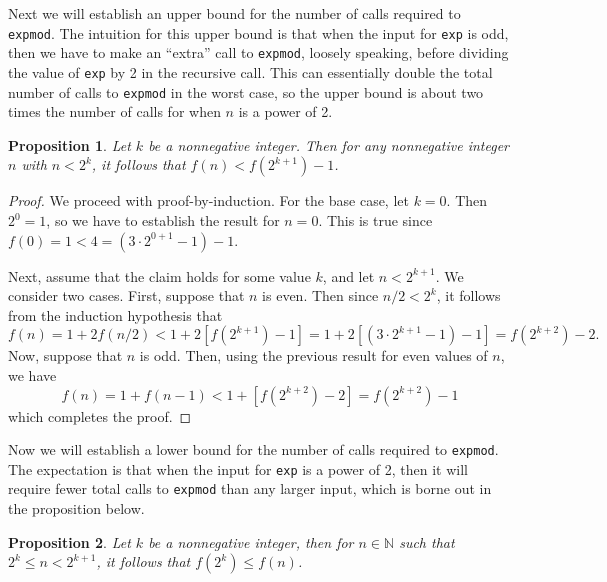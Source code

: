 \documentclass{article}
\newtheorem{proposition}{Proposition}
\begin{document}
Next we will establish an upper bound for the number of calls required to
\lstinline{expmod}.  The intuition for this upper bound is that when the input
for \lstinline{exp} is odd, then we have to make an ``extra'' call to
\lstinline{expmod}, loosely speaking, before dividing the value of
\lstinline{exp} by 2 in the recursive call.  This can essentially double the
total number of calls to \lstinline{expmod} in the worst case, so the upper
bound is about two times the number of calls for when $n$ is a power of 2.

\begin{proposition}
  \label{thm:f-non-powers-of-two}
  Let $k$ be a nonnegative integer.  Then for any nonnegative integer $n$ with
  $n < 2^k$, it follows that $f(n) < f(2^{k + 1}) - 1$.
\end{proposition}

\begin{proof}
  We proceed with proof-by-induction.  For the base case, let $k = 0$.  Then
  $2^0 = 1$, so we have to establish the result for $n = 0$.  This is true since
  $f(0) = 1 < 4 = (3 \cdot 2^{0 + 1} - 1) - 1$.

  Next, assume that the claim holds for some value $k$, and let $n < 2^{k + 1}$.
  We consider two cases.  First, suppose that $n$ is even.  Then since
  $n/2 < 2^k$, it follows from the induction hypothesis that
  \begin{equation*}
    f(n)
    = 1 + 2 f(n/2)
    < 1 + 2 \left[ f(2^{k + 1}) - 1 \right]
    = 1 + 2\left[ (3 \cdot 2^{k + 1} - 1) - 1 \right]
    = f(2^{k + 2}) - 2.
  \end{equation*}
  Now, suppose that $n$ is odd.  Then, using the previous result for even values
  of $n$, we have
  \begin{equation*}
    f(n)
    = 1 + f(n - 1)
    < 1 + \left[ f(2^{k + 2}) - 2 \right]
    = f(2^{k + 2}) - 1
  \end{equation*}
  which completes the proof.
\end{proof}

Now we will establish a lower bound for the number of calls required to
\lstinline{expmod}.  The expectation is that when the input for \lstinline{exp}
is a power of 2, then it will require fewer total calls to \lstinline{expmod}
than any larger input, which is borne out in the proposition below.

\begin{proposition}
  \label{thm:f-lower-bound}
  Let $k$ be a nonnegative integer, then for $n \in \mathbb{N}$ such that
  $2^k \leq n < 2^{k + 1}$, it follows that $f(2^k) \leq f(n)$.
\end{proposition}
\end{document}
